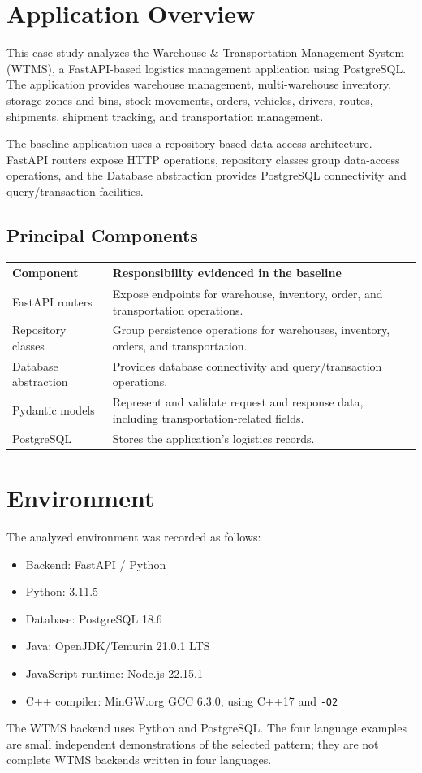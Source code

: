 \documentclass[12pt,a4paper]{article}
\begin{document}
\section{Application Overview}
This case study analyzes the Warehouse \& Transportation Management System (WTMS), a FastAPI-based logistics management application using PostgreSQL. The application provides warehouse management, multi-warehouse inventory, storage zones and bins, stock movements, orders, vehicles, drivers, routes, shipments, shipment tracking, and transportation management.

The baseline application uses a repository-based data-access architecture. FastAPI routers expose HTTP operations, repository classes group data-access operations, and the Database abstraction provides PostgreSQL connectivity and query/transaction facilities.

\subsection{Principal Components}
\begin{longtable}{p{}p{}}
\toprule
\textbf{Component} & \textbf{Responsibility evidenced in the baseline}\\
\midrule
FastAPI routers & Expose endpoints for warehouse, inventory, order, and transportation operations.\\
Repository classes & Group persistence operations for warehouses, inventory, orders, and transportation.\\
Database abstraction & Provides database connectivity and query/transaction operations.\\
Pydantic models & Represent and validate request and response data, including transportation-related fields.\\
PostgreSQL & Stores the application’s logistics records.\\
\bottomrule
\end{longtable}

\section{Environment}
The analyzed environment was recorded as follows:
\begin{itemize}
    \item Backend: FastAPI / Python
    \item Python: 3.11.5
    \item Database: PostgreSQL 18.6
    \item Java: OpenJDK/Temurin 21.0.1 LTS
    \item JavaScript runtime: Node.js 22.15.1
    \item C++ compiler: MinGW.org GCC 6.3.0, using C++17 and \texttt{-O2}
\end{itemize}
The WTMS backend uses Python and PostgreSQL. The four language examples are small independent demonstrations of the selected pattern; they are not complete WTMS backends written in four languages.
\end{document}
